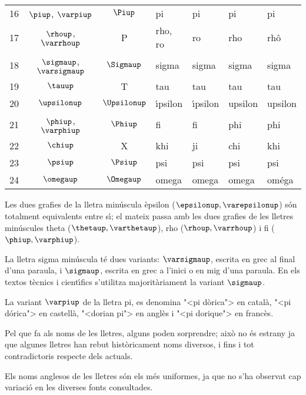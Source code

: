 \begin{table}[h]
\begin{center}
\begin{tabular}{cccllll}
   16 & $\piup$, $\varpiup$ & $\Piup$ & pi & pi &  pi & pi\\
   17 & $\rhoup$, $\varrhoup$ & P & rho, ro & ro &  rho & rh\^{o}\\
   18 & $\sigmaup$, $\varsigmaup$ & $\Sigmaup$ & sigma & sigma &  sigma &sigma\\
   19 & $\tauup$ & T & tau & tau & tau &tau\\
   20 & $\upsilonup$ & $\Upsilonup$ & \'{\i}psilon & \'{\i}psilon &  upsilon &upsilon\\
   21 & $\phiup$, $\varphiup$ & $\Phiup$ & fi & fi &  phi & phi\\
   22 & $\chiup$ & X & khi & ji &  chi & khi\\
   23 & $\psiup$ & $\Psiup$ & psi & psi &  psi & psi\\
   24 & $\omegaup$ & $\Omegaup$ & omega & omega &  omega & om\'{e}ga\\
   \bottomrule[1pt]
   \end{tabular} \end{center}
\end{table}

Les dues grafies de la lletra min\'{u}scula \`{e}psilon  ($\epsilonup,
\varepsilonup$) s\'{o}n totalment equivalents entre s\'{\i}; el mateix passa
amb les dues grafies de les lletres min\'{u}scules theta ($\thetaup,
\varthetaup$), rho ($\rhoup,\varrhoup$) i fi ($\phiup, \varphiup$).

La lletra sigma min\'{u}scula t\'{e} dues variants: $\varsigmaup$, escrita en
grec al final d'una paraula, i $\sigmaup$, escrita en grec a l'inici o
en mig d'una paraula. En els textos t\`{e}cnics i cient\'{\i}fics s'utilitza
majorit\`{a}riament la variant $\sigmaup$.

La variant $\varpiup$ de la lletra pi, es denomina {"<}pi d\`{o}rica{">} en
catal\`{a}, {"<}pi d\'{o}rica{">} en castell\`{a}, {"<}dorian pi{">} en angl\`{e}s i {"<}pi dorique{">} en franc\`{e}s.

Pel que fa als noms de les lletres, alguns poden sorprendre; aix\`{o} no
\'{e}s estrany ja que algunes lletres han rebut hist\`{o}ricament noms
diversos, i fins i tot contradictoris respecte dels actuals.

Els noms anglesos de les lletres s\'{o}n els m\'{e}s uniformes, ja que no
s'ha observat cap variaci\'{o} en les diverses fonts consultades.

